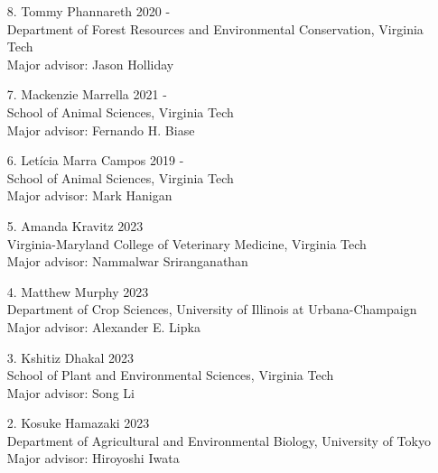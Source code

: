 \documentclass[margin,line,10pt]{res}
\begin{document}
\begin{resume}
\begin{enumerate}
  \vspace{0.3cm}
  
  \item [8.] Tommy Phannareth \hfill 2020 - \\
  Department of Forest Resources and Environmental Conservation, Virginia Tech \\
  Major advisor: Jason Holliday

  \vspace{0.3cm}

   \item [7.] Mackenzie Marrella \hfill 2021 - \\
      School of Animal Sciences, Virginia Tech\\
      Major advisor: Fernando H. Biase
  

  \vspace{0.3cm}
  
  \item [6.] Let\'{i}cia Marra Campos  \hfill 2019 - \\
  School of Animal Sciences,  Virginia Tech \\ 
  Major advisor: Mark Hanigan

  \vspace{0.3cm}


  \item [5.] Amanda Kravitz  \hfill 2023 \\
  Virginia-Maryland College of Veterinary Medicine,  Virginia Tech \\ 
  Major advisor: Nammalwar Sriranganathan

  \vspace{0.3cm}

  \item [4.] Matthew Murphy \hfill 2023 \\
  Department of Crop Sciences, University of Illinois at Urbana-Champaign \\
  Major advisor: Alexander E. Lipka 

  \vspace{0.3cm}

  \item [3.] Kshitiz Dhakal \hfill 2023 \\
  School of Plant and Environmental Sciences,  Virginia Tech \\
  Major advisor: Song Li

  \vspace{0.3cm}

  \item [2.] Kosuke Hamazaki \hfill 2023 \\
  Department of Agricultural and Environmental Biology,  University of Tokyo \\ 
  Major advisor: Hiroyoshi Iwata


\end{enumerate}
\end{resume}
\end{document}
